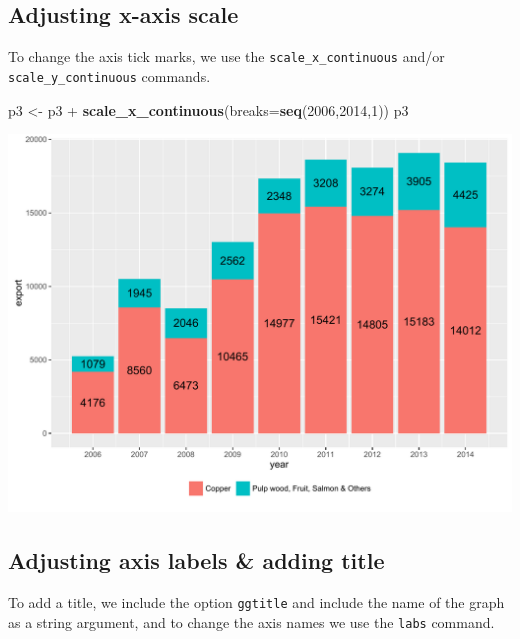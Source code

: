 \documentclass[]{article}
\newenvironment{Shaded}{\begin{snugshade}}{\end{snugshade}}
\newcommand{\KeywordTok}[1]{\textcolor[rgb]{0.13,0.29,0.53}{\textbf{{#1}}}}
\newcommand{\DataTypeTok}[1]{\textcolor[rgb]{0.13,0.29,0.53}{{#1}}}
\newcommand{\DecValTok}[1]{\textcolor[rgb]{0.00,0.00,0.81}{{#1}}}
\newcommand{\StringTok}[1]{\textcolor[rgb]{0.31,0.60,0.02}{{#1}}}
\newcommand{\NormalTok}[1]{{#1}}
\begin{document}
\subsection{Adjusting x-axis scale}\label{adjusting-x-axis-scale-2}

To change the axis tick marks, we use the \texttt{scale\_x\_continuous}
and/or \texttt{scale\_y\_continuous} commands.

\begin{Shaded}
\begin{Highlighting}[]
\NormalTok{p3 <-}\StringTok{ }\NormalTok{p3 +}\StringTok{ }\KeywordTok{scale_x_continuous}\NormalTok{(}\DataTypeTok{breaks=}\KeywordTok{seq}\NormalTok{(}\DecValTok{2006}\NormalTok{,}\DecValTok{2014}\NormalTok{,}\DecValTok{1}\NormalTok{))}
\NormalTok{p3}
\end{Highlighting}
\end{Shaded}

\begin{center}\includegraphics{0_all_posts_pdf/bar_6-1} \end{center}

\subsection{Adjusting axis labels \& adding
title}\label{adjusting-axis-labels-adding-title-2}

To add a title, we include the option \texttt{ggtitle} and include the
name of the graph as a string argument, and to change the axis names we
use the \texttt{labs} command.

\begin{Shaded}
\end{Shaded}
\end{document}
